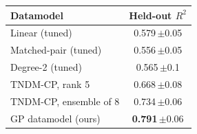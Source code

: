 \begin{tabular}{@{}lc@{}}
\toprule
Datamodel & Held-out $R^2$ \\
\midrule
Linear (tuned) & 0.579\,{\scriptsize$\pm$0.05} \\
Matched-pair (tuned) & 0.556\,{\scriptsize$\pm$0.05} \\
Degree-2 (tuned) & 0.565\,{\scriptsize$\pm$0.1} \\
TNDM-CP, rank 5 & 0.668\,{\scriptsize$\pm$0.08} \\
TNDM-CP, ensemble of 8 & 0.734\,{\scriptsize$\pm$0.06} \\
GP datamodel (ours) & \textbf{0.791}\,{\scriptsize$\pm$0.06} \\
\bottomrule
\end{tabular}
